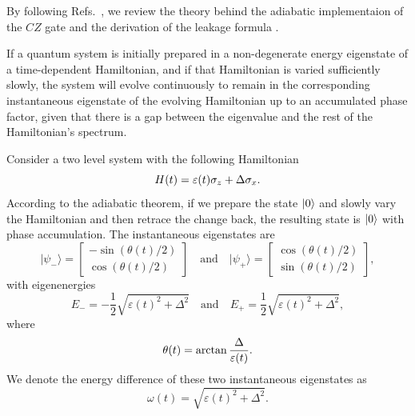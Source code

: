 By following Refs.~\cite{Ding2025,Martinis2014}, we review the theory behind the adiabatic implementaion of the $CZ$ gate and
the derivation of the leakage formula .
\begin{theorem}
  If a quantum system is initially prepared in a non-degenerate energy eigenstate of a time-dependent Hamiltonian, and
  if that Hamiltonian is varied sufficiently slowly, the system will evolve continuously to remain in the corresponding
  instantaneous eigenstate of the evolving Hamiltonian up to an accumulated phase factor, given that there is a gap
  between the eigenvalue and the rest of the Hamiltonian's spectrum.
\end{theorem}
Consider a two level system with the following Hamiltonian
$$
  H(t)=\varepsilon(t)\sigma_z + \Delta\sigma_x.
$$
According to the adiabatic theorem, if we prepare the state $\ket{0}$ and slowly vary the Hamiltonian and then retrace the
change back, the resulting state is $\ket{0}$ with phase accumulation.
The instantaneous eigenstates are
\begin{equation}
  \vert{}\psi_-\rangle = \begin{bmatrix} -\sin(\theta(t)/2) \\ \cos(\theta(t)/2) \end{bmatrix} \quad \text{and} \quad \vert{}\psi_+\rangle = \begin{bmatrix} \cos(\theta(t)/2) \\ \sin(\theta(t)/2) \end{bmatrix},
\end{equation}
with eigenenergies
\begin{equation}
  E_- = -\frac{1}{2}\sqrt{\varepsilon(t)^2 + \Delta^2} \quad \text{and} \quad E_+ = \frac{1}{2}\sqrt{\varepsilon(t)^2 + \Delta^2},
\end{equation}
where
\begin{equation}
  \theta(t) = \arctan\frac{\Delta}{\varepsilon(t)}.
  \label{eq:theta}
\end{equation}
We denote the energy difference of these two instantaneous eigenstates as
\begin{equation}
  \omega(t) = \sqrt{\varepsilon(t)^2 + \Delta^2}.
  \label{eq:omega}
\end{equation}

